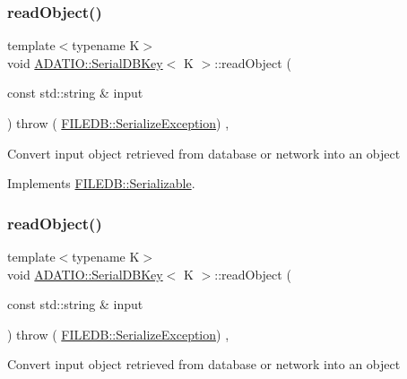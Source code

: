 \subsubsection{\texorpdfstring{readObject()}{readObject()}\hspace{0.1cm}{\footnotesize\ttfamily [1/2]}}
{\footnotesize\ttfamily template$<$typename K$>$ \\
void \mbox{\hyperlink{classADATIO_1_1SerialDBKey}{A\+D\+A\+T\+I\+O\+::\+Serial\+D\+B\+Key}}$<$ K $>$\+::read\+Object (\begin{DoxyParamCaption}\item[{const std\+::string \&}]{input }\end{DoxyParamCaption}) throw ( \mbox{\hyperlink{classFILEDB_1_1SerializeException}{F\+I\+L\+E\+D\+B\+::\+Serialize\+Exception}}) \hspace{0.3cm}{\ttfamily [inline]}, {\ttfamily [virtual]}}

Convert input object retrieved from database or network into an object 

Implements \mbox{\hyperlink{classFILEDB_1_1Serializable_a21a5831fa4f65790490a8a5eba9fcab2}{F\+I\+L\+E\+D\+B\+::\+Serializable}}.

\mbox{\label{classADATIO_1_1SerialDBKey_a10b5c24f2529bac1df4c4603c2caf551}} 
\subsubsection{\texorpdfstring{readObject()}{readObject()}\hspace{0.1cm}{\footnotesize\ttfamily [2/2]}}
{\footnotesize\ttfamily template$<$typename K$>$ \\
void \mbox{\hyperlink{classADATIO_1_1SerialDBKey}{A\+D\+A\+T\+I\+O\+::\+Serial\+D\+B\+Key}}$<$ K $>$\+::read\+Object (\begin{DoxyParamCaption}\item[{const std\+::string \&}]{input }\end{DoxyParamCaption}) throw ( \mbox{\hyperlink{classFILEDB_1_1SerializeException}{F\+I\+L\+E\+D\+B\+::\+Serialize\+Exception}}) \hspace{0.3cm}{\ttfamily [inline]}, {\ttfamily [virtual]}}

Convert input object retrieved from database or network into an object 


